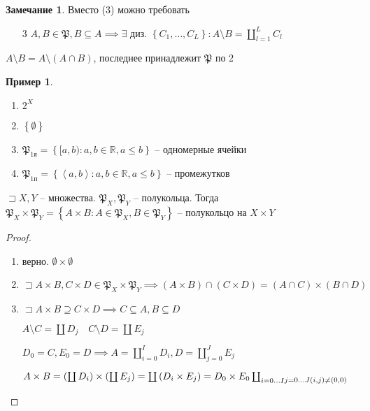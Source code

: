\documentclass{book}
\newcommand\R{\ensuremath{\mathbb{R}}}
\renewcommand\O{\ensuremath{\emptyset}}
\theoremstyle{definition}
\newtheorem*{note}{Замечание}
\newtheorem*{example}{Пример}
\begin{document}
\begin{note}
    Вместо (3) можно требовать 
    \begin{itemize}
        \item [3] $A, B\in \mathfrak P, B\subseteq A \implies \exists $ диз. $\left\{ C_1, \ldots, C_L \right\} : A\setminus B = \coprod_{l=1}^LC_l$
    \end{itemize}

    $A\setminus B = A\setminus (A\cap B)$, последнее принадлежит $\mathfrak P$ по 2
\end{note}

\begin{example}
    \begin{enumerate}
        \item $2^X$
        \item  $\left\{ \O  \right\} $
        \item $\mathfrak P_{1\text{я}} = \left\{ [a,b): a,b\in \R, a\leqslant b \right\} $ -- одномерные ячейки
        \item $\mathfrak P_{1\text{п}} = \left\{ \left<a,b \right>: a,b \in \R, a \leqslant b \right\} $ -- промежутков
    \end{enumerate}
\end{example}

\begin{statement}

    $\sqsupset X, Y$ -- множества. $\mathfrak P_X, \mathfrak P_Y$ -- полукольца. Тогда  $\mathfrak P_X \times \mathfrak P_Y = \left\{ A\times B:A\in \mathfrak P_X, B\in \mathfrak P_Y \right\} $ -- полукольцо на $X\times Y$
\end{statement}
\begin{proof}
    \begin{enumerate}
        \item верно. $\O \times \O $
        \item $\sqsupset A\times B, C\times D\in  \mathfrak P_X \times \mathfrak P_Y \implies (A\times B)\cap (C\times D) = (A\cap C)\times (B\cap D)$
        \item $\sqsupset A\times B \supseteq C\times D\implies C\subseteq A, B\subseteq D$

            $A\setminus C = \coprod D_j\quad C\setminus D = \coprod E_j$

            $D_0 = C, E_0 = D \implies A = \coprod_{i=0}^I D_i, D = \coprod_{j=0}^J E_j$ 

            $A\times B = \left( \coprod D_i \right) \times \left( \coprod E_j \right) = \coprod \left( D_i\times E_j \right)  = D_0\times E_0 \coprod_{\substack{i = 0 \ldots I}\\j = 0 \ldots J\\ \left( i, j \right) \neq \left( 0, 0 \right) } $
    \end{enumerate}
\end{proof}
\end{document}
